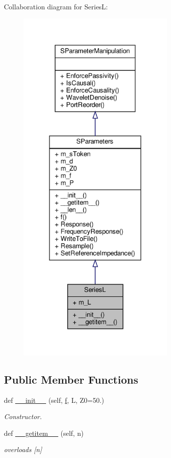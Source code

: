 Collaboration diagram for SeriesL\+:\nopagebreak
\begin{figure}[H]
\begin{center}
\leavevmode
\includegraphics[width=220pt]{classSignalIntegrity_1_1SParameters_1_1Devices_1_1SeriesL_1_1SeriesL__coll__graph}
\end{center}
\end{figure}
\subsection*{Public Member Functions}
\begin{DoxyCompactItemize}
\item 
def \hyperlink{classSignalIntegrity_1_1SParameters_1_1Devices_1_1SeriesL_1_1SeriesL_ad506006bc5bc92f9e3fdb69c52d64eba}{\+\_\+\+\_\+init\+\_\+\+\_\+} (self, \hyperlink{classSignalIntegrity_1_1SParameters_1_1SParameters_1_1SParameters_a32e7a34d6837fe949b413c852a0447f8}{f}, L, Z0=50.)
\begin{DoxyCompactList}\small\item\em Constructor. \end{DoxyCompactList}\item 
def \hyperlink{classSignalIntegrity_1_1SParameters_1_1Devices_1_1SeriesL_1_1SeriesL_ab7a6da5139e0878b590d68292aaa70f2}{\+\_\+\+\_\+getitem\+\_\+\+\_\+} (self, n)
\begin{DoxyCompactList}\small\item\em overloads \mbox{[}n\mbox{]} \end{DoxyCompactList}\end{DoxyCompactItemize}


